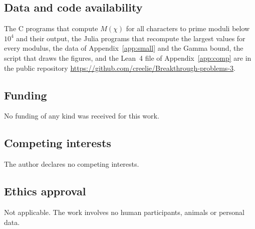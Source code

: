 \documentclass[11pt,a4paper,reqno]{amsart}
\theoremstyle{remark}
\numberwithin{equation}{section}
\begin{document}
\subsection*{Data and code availability}
The C programs that compute $M(\chi)$ for all characters to prime moduli below $10^4$ and their output, the Julia programs that recompute the largest values for every modulus, the data of Appendix~\ref{app:small} and the Gamma bound, the script that draws the figures, and the Lean~4 file of Appendix~\ref{app:comp} are in the public repository \url{https://github.com/creelie/Breakthrough-problems-3}.

\subsection*{Funding}
No funding of any kind was received for this work.

\subsection*{Competing interests}
The author declares no competing interests.

\subsection*{Ethics approval}
Not applicable. The work involves no human participants, animals or personal data.
\end{document}
